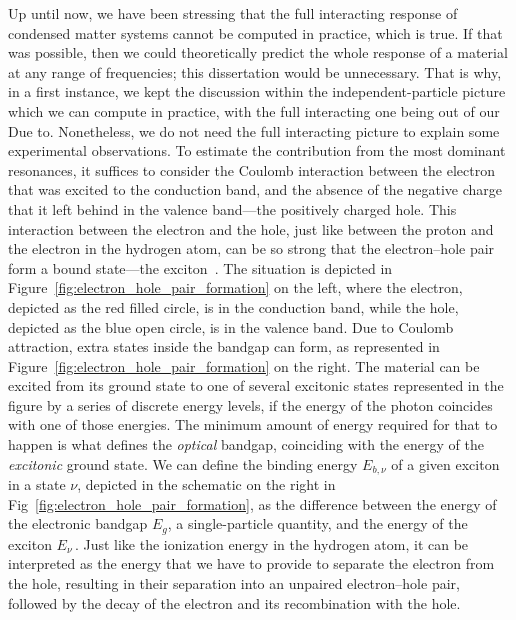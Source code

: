 Up until now, we have been stressing that the full interacting response of condensed matter systems cannot be computed in practice, which is true.
If that was possible, then we could theoretically predict the whole response of a material at any range of frequencies; this dissertation would be unnecessary.
That is why, in a first instance, we kept the discussion within the independent-particle picture which we can compute in practice, with the full interacting one being out of our Due to.
Nonetheless, we do not need the full interacting picture to explain some experimental observations.
To estimate the contribution from the most dominant resonances, it suffices to consider the Coulomb interaction between the electron that was excited to the conduction band, and the absence of the negative charge that it left behind in the valence band---the positively charged hole.
This interaction between the electron and the hole, just like between the proton and the electron in the hydrogen atom, can be so strong that the electron--hole pair form a bound state---the exciton~\cite{Datta_Marie_2024}.
The situation is depicted in Figure~\ref{fig:electron_hole_pair_formation} on the left, where the electron, depicted as the red filled circle, is in the conduction band, while the hole, depicted as the blue open circle, is in the valence band.
Due to Coulomb attraction, extra states inside the bandgap can form, as represented in Figure~\ref{fig:electron_hole_pair_formation} on the right.
The material can be excited from its ground state to one of several excitonic states represented in the figure by a series of discrete energy levels, if the energy of the photon coincides with one of those energies.
The minimum amount of energy required for that to happen is what defines the \textit{optical} bandgap, coinciding with the energy of the \textit{excitonic} ground state.
We can define the binding energy $E_{b, \nu}$ of a given exciton in a state $\nu$, depicted in the schematic on the right in Fig~\ref{fig:electron_hole_pair_formation}, as the difference between the energy of the electronic bandgap $E_g$, a single-particle quantity, and the energy of the exciton $E_{\nu}$\,.
Just like the ionization energy in the hydrogen atom, it can be interpreted as the energy that we have to provide to separate the electron from the hole, resulting in their separation into an unpaired electron--hole pair, followed by the decay of the electron and its recombination with the hole.

